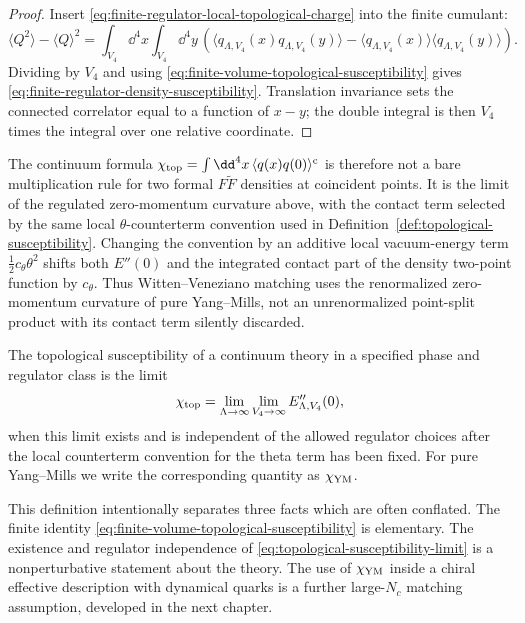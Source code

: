 \begin{proof}
Insert \eqref{eq:finite-regulator-local-topological-charge} into the finite
cumulant:
\[
  \langle Q^2\rangle-\langle Q\rangle^2
  =
  \int_{V_4}\dd^4x
  \int_{V_4}\dd^4y\,
  \left(
    \langle q_{\Lambda,V_4}(x)q_{\Lambda,V_4}(y)\rangle
    -
    \langle q_{\Lambda,V_4}(x)\rangle
    \langle q_{\Lambda,V_4}(y)\rangle
  \right).
\]
Dividing by \(V_4\) and using
\eqref{eq:finite-volume-topological-susceptibility} gives
\eqref{eq:finite-regulator-density-susceptibility}.  Translation invariance
sets the connected correlator equal to a function of \(x-y\); the double
integral is then \(V_4\) times the integral over one relative coordinate.
\end{proof}

The continuum formula
\(\chi_{\rm top}=\int\dd^4x\,\langle q(x)q(0)\rangle^{\rm c}\) is therefore
not a bare multiplication rule for two formal \(F\widetilde F\) densities at
coincident points.  It is the limit of the regulated zero-momentum curvature
above, with the contact term selected by the same local \(\theta\)-counterterm
convention used in
Definition~\ref{def:topological-susceptibility}.  Changing the convention by
an additive local vacuum-energy term \(\frac12 c_\theta\theta^2\) shifts both
\(E''(0)\) and the integrated contact part of the density two-point function
by \(c_\theta\).  Thus Witten--Veneziano matching uses the renormalized
zero-momentum curvature of pure Yang--Mills, not an unrenormalized
point-split product with its contact term silently discarded.

\begin{definition}
\label{def:topological-susceptibility}
The topological susceptibility of a continuum theory in a specified phase and
regulator class is the limit
\begin{equation}
  \chi_{\rm top}
  =
  \lim_{\Lambda\to\infty}\lim_{V_4\to\infty}
  E_{\Lambda,V_4}''(0),
  \label{eq:topological-susceptibility-limit}
\end{equation}
when this limit exists and is independent of the allowed regulator choices
after the local counterterm convention for the theta term has been fixed.
For pure Yang--Mills we write the corresponding quantity as
\(\chi_{\rm YM}\).
\end{definition}

This definition intentionally separates three facts which are often conflated.
The finite identity
\eqref{eq:finite-volume-topological-susceptibility} is elementary.  The
existence and regulator independence of
\eqref{eq:topological-susceptibility-limit} is a nonperturbative statement
about the theory.  The use of \(\chi_{\rm YM}\) inside a chiral effective
description with dynamical quarks is a further large-\(N_c\) matching
assumption, developed in the next chapter.

